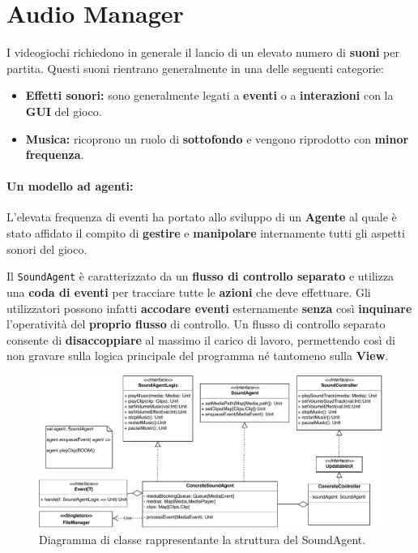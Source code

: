 \section{Audio Manager}
\label{sec:audio_manager_design}
I videogiochi richiedono in generale il lancio di un elevato numero di \textbf{suoni} per partita.
Questi suoni rientrano generalmente in una delle seguenti categorie:
\begin{itemize}
    \item \textbf{Effetti sonori:} sono generalmente legati a \textbf{eventi} o a \textbf{interazioni} con la \textbf{GUI} del gioco.
    \item \textbf{Musica:} ricoprono un ruolo di \textbf{sottofondo} e vengono riprodotto con \textbf{minor frequenza}.
\end{itemize}

\paragraph{Un modello ad agenti:}
L'elevata frequenza di eventi ha portato allo sviluppo di un \textbf{Agente} al quale è stato affidato il compito di \textbf{gestire} e \textbf{manipolare} internamente tutti gli aspetti sonori del gioco.

Il \texttt{SoundAgent} è caratterizzato da un  \textbf{flusso di controllo separato} e utilizza una \textbf{coda di eventi} per tracciare tutte le \textbf{azioni} che deve effettuare. Gli utilizzatori possono infatti \textbf{accodare eventi} esternamente \textbf{senza} così \textbf{inquinare} l'operatività del \textbf{proprio flusso} di controllo.
Un flusso di controllo separato consente di \textbf{disaccoppiare} al massimo il carico di lavoro, permettendo così di non gravare sulla logica principale del programma né tantomeno sulla \textbf{View}.

\begin{figure}[H]
	\centering
	\includegraphics[width=0.99\columnwidth]{drawio/audioAgent/audioAgent.pdf}
	\caption{Diagramma di classe rappresentante la struttura del SoundAgent.}
	\label{fig:AudioAgent}
\end{figure}

